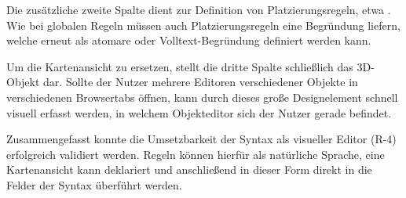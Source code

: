 \medskip

Die zusätzliche zweite Spalte dient zur Definition von Platzierungsregeln, etwa . Wie bei globalen Regeln müssen auch Platzierungsregeln eine Begründung liefern, welche erneut als atomare oder Volltext-Begründung definiert werden kann.

\medskip

Um die Kartenansicht zu ersetzen, stellt die dritte Spalte schließlich das 3D-Objekt dar. Sollte der Nutzer mehrere Editoren verschiedener Objekte in verschiedenen Browsertabs öffnen, kann durch dieses große Designelement schnell visuell erfasst werden, in welchem Objekteditor sich der Nutzer gerade befindet.

\medskip

Zusammengefasst konnte die Umsetzbarkeit der Syntax als visueller Editor (R-4) erfolgreich validiert werden. Regeln können hierfür als natürliche Sprache, eine Kartenansicht kann deklariert und anschließend in dieser Form direkt in die Felder der Syntax überführt werden.
